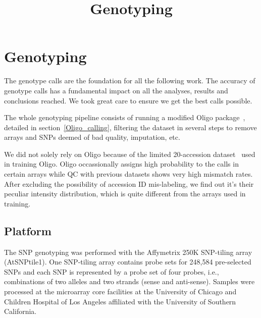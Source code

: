 \documentclass[a4paper,10pt]{article}
\title{Genotyping}
\begin{document}
\maketitle

\begin{abstract}

\end{abstract}

\tableofcontents

\section{Genotyping}
The genotype calls are the foundation for all the following work. The accuracy of genotype calls has a fundamental impact on all the analyses, results and conclusions reached. We took great care to ensure we get the best calls possible.

The whole genotyping pipeline consists of running a modified Oligo package~\cite{Carvalho2007}, detailed in section~\ref{Oligo_calling}, filtering the dataset in several steps to remove arrays and SNPs deemed of bad quality, imputation, etc.

We did not solely rely on Oligo because of the limited 20-accession dataset~\cite{Clark2007a} used in training Oligo. Oligo occassionally assigns high probability to the calls in certain arrays while QC with previous datasets shows very high mismatch rates. After excluding the possibility of accession ID mis-labeling, we find out it's their peculiar intensity distribution, which is quite different from the arrays used in training.

\subsection{Platform}
The SNP genotyping was performed with the Affymetrix 250K SNP-tiling array (AtSNPtile1). One SNP-tiling array contains probe sets for 248,584 pre-selected SNPs and each SNP is represented by a probe set of four probes, i.e., combinations of two alleles and two strands (sense and anti-sense). Samples were processed at the microarray core facilities at the University of Chicago and Children Hospital of Los Angeles affiliated with the University of Southern California.
\end{document}
